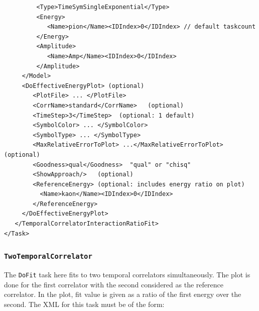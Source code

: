 \documentclass[12pt]{article}
\newcommand{\vb}{\texttt}
\begin{document}
\begin{verbatim}
         <Type>TimeSymSingleExponential</Type>                           
         <Energy>                                                        
            <Name>pion</Name><IDIndex>0</IDIndex> // default taskcount   
         </Energy>                                                       
         <Amplitude>                                                     
            <Name>Amp</Name><IDIndex>0</IDIndex>                         
         </Amplitude>                                                    
     </Model>                                                            
     <DoEffectiveEnergyPlot> (optional)                                  
        <PlotFile> ... </PlotFile>                                       
        <CorrName>standard</CorrName>   (optional)                       
        <TimeStep>3</TimeStep>  (optional: 1 default)                    
        <SymbolColor> ... </SymbolColor>                                 
        <SymbolType> ... </SymbolType>                                   
        <MaxRelativeErrorToPlot> ...</MaxRelativeErrorToPlot> (optional) 
        <Goodness>qual</Goodness>  "qual" or "chisq"                     
        <ShowApproach/>   (optional)                                     
        <ReferenceEnergy> (optional: includes energy ratio on plot)      
          <Name>kaon</Name><IDIndex>0</IDIndex>                          
        </ReferenceEnergy>                                               
     </DoEffectiveEnergyPlot>                                            
   </TemporalCorrelatorInteractionRatioFit>                              
</Task>                                                                  
\end{verbatim}


\subsubsection{\vb{TwoTemporalCorrelator}}
The \vb{DoFit} task here fits to two temporal correlators simultaneously. The plot is done for the
first correlator with the second considered as the reference correlator. In the plot, fit value is given
as a ratio of the first energy over the second.
The XML for this task must be of the form:
\end{document}
